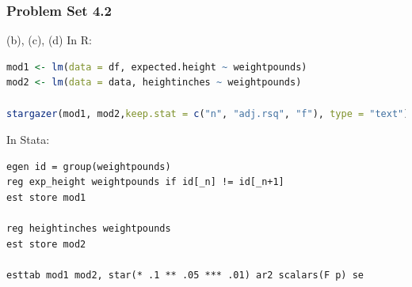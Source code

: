 \documentclass[xcolor=table]{beamer}
\begin{document}


\begin{frame}[fragile]
\frametitle{Problem Set 4.2}
(b), (c), (d) \pause In R: 
\begin{lstlisting}[language = R]
mod1 <- lm(data = df, expected.height ~ weightpounds)
mod2 <- lm(data = data, heightinches ~ weightpounds)

stargazer(mod1, mod2,keep.stat = c("n", "adj.rsq", "f"), type = "text")
\end{lstlisting} \pause

In Stata: 
\begin{lstlisting}
egen id = group(weightpounds)
reg exp_height weightpounds if id[_n] != id[_n+1]
est store mod1

reg heightinches weightpounds
est store mod2

esttab mod1 mod2, star(* .1 ** .05 *** .01) ar2 scalars(F p) se
\end{lstlisting} 
\end{frame}
\end{document}
